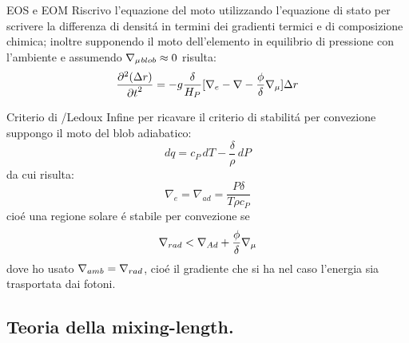 \begin{wordonframe}{EOS e EOM}
Riscrivo l'equazione del moto utilizzando l'equazione di stato per scrivere la differenza di densit\'a in termini dei gradienti termici e di composizione chimica; inoltre supponendo il moto dell'elemento in equilibrio di pressione con l'ambiente e assumendo $\nmu{}_{blob}\approx0$ risulta:
\begin{equation*}
\PtwoDy{t}{(\Delta r)}=-g\frac{\delta}{H_P}[\nabla_e-\nabla-\frac{\phi}{\delta}\nmu{}]\Delta r
\end{equation*}
\end{wordonframe}

\begin{wordonframe}{Criterio di \sch/Ledoux}
Infine per ricavare il criterio di stabilit\'a per convezione suppongo  il moto del blob adiabatico:
\begin{equation*}
dq=c_P\,dT-\frac{\delta}{\rho}\,dP
\end{equation*}
da cui risulta:
\begin{equation*}
\nabla_e=\nabla_{ad}=\frac{P\delta}{T\rho c_P}
\end{equation*}
cio\'e una regione solare \'e stabile per convezione se
\begin{equation*}
\nrad{}<\nad+\frac{\phi}{\delta}\nmu{}\label{eq:ledoux}
\end{equation*}
dove ho usato $\nabla_{amb}=\nrad{}$, cio\'e il gradiente che si ha nel caso l'energia sia trasportata dai fotoni.
\end{wordonframe}

\subsection{Teoria della mixing-length.}

